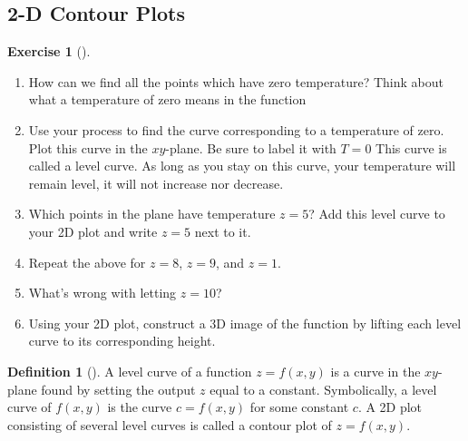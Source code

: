 \documentclass[10pt,]{book}
\theoremstyle{plain}
\theoremstyle{definition}
\newtheorem{definition}[theorem]{Definition}
\theoremstyle{definition}
\theoremstyle{definition}
\theoremstyle{definition}
\newtheorem{exploration}[project]{Exercise}
\theoremstyle{definition}
\numberwithin{equation}{section}
\begin{document}
\subsection[{2-D Contour Plots}]{2-D Contour Plots}\label{subsection-24}
\begin{exploration}[]\label{prob_intro_to_contour_plots}
\leavevmode%
\begin{enumerate}[font=\bfseries,label=(\alph*),ref=\alph*]
\item\label{task-213} How can we find all the points which have zero temperature? Think about what a temperature of zero means in the function%
%
\item\label{task-214} Use your process to find the curve corresponding to a temperature of zero. Plot this curve in the \(xy\)-plane. Be sure to label it with \(T=0\) This curve is called a level curve. As long as you stay on this curve, your temperature will remain level, it will not increase nor decrease.%
\item\label{task-215} Which points in the plane have temperature \(z=5\)?  Add this level curve to your 2D plot and write \(z=5\) next to it.%
\item\label{task-216} Repeat the above for \(z=8\), \(z=9\), and \(z=1\).  %
\item\label{task-217} What's wrong with letting \(z=10\)?%
\item\label{task-218} Using your 2D plot, construct a 3D image of the function by lifting each level curve to its corresponding height.%
\end{enumerate}
\end{exploration}
\begin{definition}[{}]\label{definition-22}
A level curve of a function \(z=f(x,y)\) is a curve in the \(xy\)-plane found by setting the output \(z\) equal to a constant. Symbolically, a level curve of \(f(x,y)\) is the curve \(c=f(x,y)\) for some constant \(c\). A 2D plot consisting of several level curves is called a contour plot of \(z=f(x,y)\).%
\end{definition}
\typeout{************************************************}
\typeout{************************************************}
\end{document}
